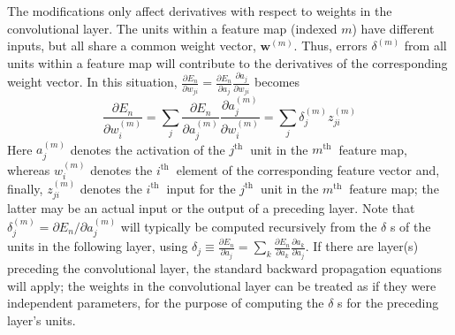 \documentclass[a4 paper]{article}
\begin{document}
The modifications only affect derivatives with respect to weights in the convolutional layer. The units within a feature map (indexed $m$) have different inputs, but all share a common weight vector, $\mathbf{w}^{(m)} .$ Thus, errors $\delta^{(m)}$ from all units within a feature map will contribute to the derivatives of the corresponding weight vector. In this situation, $\frac{\partial E_{n}}{\partial w_{j i}}=\frac{\partial E_{n}}{\partial a_{j}} \frac{\partial a_{j}}{\partial w_{j i}}$ becomes
$$
\frac{\partial E_{n}}{\partial w_{i}^{(m)}}=\sum_{j} \frac{\partial E_{n}}{\partial a_{j}^{(m)}} \frac{\partial a_{j}^{(m)}}{\partial w_{i}^{(m)}}=\sum_{j} \delta_{j}^{(m)} z_{j i}^{(m)}
$$
Here $a_{j}^{(m)}$ denotes the activation of the $j^{\text {th }}$ unit in the $m^{\text {th }}$ feature map, whereas $w_{i}^{(m)}$ denotes the $i^{\text {th }}$ element of the corresponding feature vector and, finally, $z_{j i}^{(m)}$ denotes the $i^{\text {th }}$ input for the $j^{\text {th }}$ unit in the $m^{\text {th }}$ feature map; the latter may be an actual input or the output of a preceding layer. Note that $\delta_{j}^{(m)}=\partial E_{n} / \partial a_{j}^{(m)}$ will typically be computed recursively from the $\delta$ s of the units in the following layer, using $\delta_{j} \equiv \frac{\partial E_{n}}{\partial a_{j}}=\sum_{k} \frac{\partial E_{n}}{\partial a_{k}} \frac{\partial a_{k}}{\partial a_{j}}$. If there are layer(s) preceding the convolutional layer, the standard backward propagation equations will apply; the weights in the convolutional layer can be treated as if they were independent parameters, for the purpose of computing the $\delta$ s for the preceding layer's units.

\nocite{*} %

\end{document}
